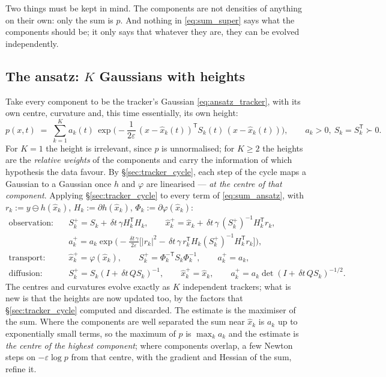 \documentclass[11pt,a4paper]{article}
\newcommand{\T}{^{\mathsf T}}
\newcommand{\xh}{\hat{x}}
\newcommand{\eps}{\varepsilon}
\newcommand{\abs}[1]{\left\lvert #1 \right\rvert}
\newcommand{\dt}{\,\delta t}
\theoremstyle{plain}
\theoremstyle{definition}
\theoremstyle{remark}
\begin{document}
Two things must be kept in mind. The components are not densities of anything on their own: only the sum is $p$. And nothing in \eqref{eq:sum_super} says what the components should be; it only says that whatever they are, they can be evolved independently.

\subsection{The ansatz: $K$ Gaussians with heights}

Take every component to be the tracker's Gaussian \eqref{eq:ansatz_tracker}, with its own centre, curvature and, this time essentially, its own height:
\begin{equation}
  p(x,t) \;=\; \sum_{k=1}^K a_k(t)\,\exp\Big(-\frac1{2\eps}\,(x-\xh_k(t))\T S_k(t)\,(x-\xh_k(t))\Big), \qquad a_k>0,\ S_k=S_k\T\succ0 .
  \label{eq:sum_ansatz}
\end{equation}
For $K=1$ the height is irrelevant, since $p$ is unnormalised; for $K\ge2$ the heights are the \emph{relative weights} of the components and carry the information of which hypothesis the data favour. By \S\ref{sec:tracker_cycle}, each step of the cycle maps a Gaussian to a Gaussian once $h$ and $\varphi$ are linearised --- \emph{at the centre of that component}. Applying \S\ref{sec:tracker_cycle} to every term of \eqref{eq:sum_ansatz}, with $r_k:=y\ominus h(\xh_k)$, $H_k:=\partial h(\xh_k)$, $\Phi_k:=\partial\varphi(\xh_k)$:
\begin{align}
  \text{observation:}\quad & S_k^+ = S_k+\dt\,\gamma H_k\T H_k, \qquad \xh_k^+ = \xh_k+\dt\,\gamma\,(S_k^+)^{-1}H_k\T r_k, \nonumber\\
  & a_k^+ = a_k\exp\Big(-\frac{\dt\,\gamma}{2\eps}\Big[\abs{r_k}^2-\dt\,\gamma\,r_k\T H_k(S_k^+)^{-1}H_k\T r_k\Big]\Big), \label{eq:sum_obs}\\
  \text{transport:}\quad & \xh_k^+ = \varphi(\xh_k), \qquad S_k^+ = \Phi_k^{-\mathsf T}S_k\Phi_k^{-1}, \qquad a_k^+ = a_k, \label{eq:sum_transport}\\
  \text{diffusion:}\quad & S_k^+ = S_k(I+\dt\,QS_k)^{-1}, \qquad \xh_k^+=\xh_k, \qquad a_k^+ = a_k\det(I+\dt\,QS_k)^{-1/2}. \label{eq:sum_diff}
\end{align}
The centres and curvatures evolve exactly as $K$ independent trackers; what is new is that the heights are now updated too, by the factors that \S\ref{sec:tracker_cycle} computed and discarded. The estimate is the maximiser of the sum. Where the components are well separated the sum near $\xh_k$ is $a_k$ up to exponentially small terms, so the maximum of $p$ is $\max_ka_k$ and the estimate is \emph{the centre of the highest component}; where components overlap, a few Newton steps on $-\eps\log p$ from that centre, with the gradient and Hessian of the sum, refine it.
\end{document}
